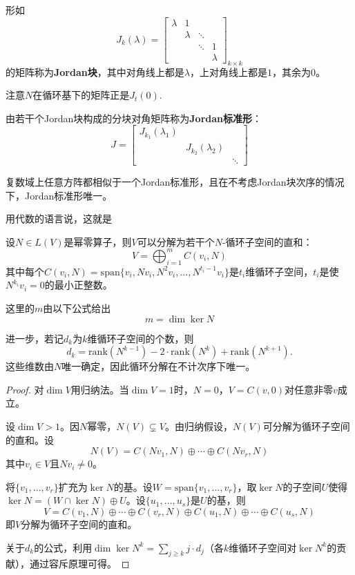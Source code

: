\begin{definition}[Jordan块]
形如
\[
J_k(\lambda) = \begin{bmatrix}
\lambda & 1 & & \\
& \lambda & \ddots & \\
& & \ddots & 1 \\
& & & \lambda
\end{bmatrix}_{k \times k}
\]
的矩阵称为\textbf{Jordan块}，其中对角线上都是$\lambda$，上对角线上都是$1$，其余为$0$。
\end{definition}
注意$N$在循环基下的矩阵正是$J_t(0)$.
\begin{definition}[Jordan标准形]
由若干个Jordan块构成的分块对角矩阵称为\textbf{Jordan标准形}：
\[
J = \begin{bmatrix}
J_{k_1}(\lambda_1) & & \\
& J_{k_2}(\lambda_2) & \\
& & \ddots
\end{bmatrix}
\]
\end{definition}

\begin{theorem}[Jordan标准形定理]
复数域上任意方阵都相似于一个Jordan标准形，且在不考虑Jordan块次序的情况下，Jordan标准形唯一。
\end{theorem}
用代数的语言说，这就是

\begin{theorem}[幂零算子的循环分解定理]
设$N \in L(V)$是幂零算子，则$V$可以分解为若干个$N$-循环子空间的直和：
\[
V = \bigoplus_{i=1}^m C(v_i, N)
\]
其中每个$C(v_i, N) = \mathrm{span}\{v_i, Nv_i, N^2v_i, \ldots, N^{t_i-1}v_i\}$是$t_i$维循环子空间，$t_i$是使$N^{k_i}v_i = 0$的最小正整数。

这里的$m$由以下公式给出
\[
m=\dim\ker N
\]

进一步，若记$d_k$为$k$维循环子空间的个数，则
\[
d_k = \mathrm{rank}(N^{k-1}) - 2\cdot\mathrm{rank}(N^k) + \mathrm{rank}(N^{k+1}).
\]
这些维数由$N$唯一确定，因此循环分解在不计次序下唯一。
\end{theorem}

\begin{proof}
对$\dim V$用归纳法。当$\dim V = 1$时，$N = 0$，$V = C(v, 0)$对任意非零$v$成立。

设$\dim V > 1$。因$N$幂零，$N(V) \subsetneq V$。由归纳假设，$N(V)$可分解为循环子空间的直和。设
\[
N(V) = C(Nv_1, N) \oplus \cdots \oplus C(Nv_r, N)
\]
其中$v_i \in V$且$Nv_i \neq 0$。

将$\{v_1, \ldots, v_r\}$扩充为$\ker N$的基。设$W = \mathrm{span}\{v_1, \ldots, v_r\}$，取$\ker N$的子空间$U$使得$\ker N = (W \cap \ker N) \oplus U$。设$\{u_1, \ldots, u_s\}$是$U$的基，则
$$V = C(v_1, N) \oplus \cdots \oplus C(v_r, N) \oplus C(u_1, N) \oplus \cdots \oplus C(u_s, N)$$
即$V$分解为循环子空间的直和。

关于$d_k$的公式，利用$\dim \ker N^k = \sum_{j \geq k} j \cdot d_j$（各$k$维循环子空间对$\ker N^k$的贡献），通过容斥原理可得。
\end{proof}

